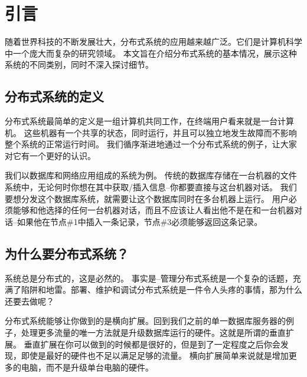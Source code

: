 \documentclass[degree=project,degree-type=project,cjk-font=noto]{thuthesis}
\begin{document}
\maketitle

\frontmatter
% 



\mainmatter

\chapter{引言}

随着世界科技的不断发展壮大，分布式系统的应用越来越广泛。它们是计算机科学中一个庞大而复杂的研究领域。
本文旨在介绍分布式系统的基本情况，展示这种系统的不同类别，同时不深入探讨细节。

\section{分布式系统的定义}

分布式系统最简单的定义是一组计算机共同工作，在终端用户看来就是一台计算机。
这些机器有一个共享的状态，同时运行，并且可以独立地发生故障而不影响整个系统的正常运行时间。
我们循序渐进地通过一个分布式系统的例子，让大家对它有一个更好的认识。

我们以数据库和网络应用组成的系统为例。
传统的数据库存储在一台机器的文件系统中，无论何时你想在其中获取/插入信息--你都要直接与这台机器对话。
我们要想分发这个数据库系统，就需要让这个数据库同时在多台机器上运行。
用户必须能够和他选择的任何一台机器对话，而且不应该让人看出他不是在和一台机器对话--如果他在节点\#1中插入一条记录，节点\#3必须能够返回这条记录。

\section{为什么要分布式系统？}

系统总是分布式的，这是必然的。
事实是--管理分布式系统是一个复杂的话题，充满了陷阱和地雷。部署、维护和调试分布式系统是一件令人头疼的事情，那为什么还要去做呢？

分布式系统能够让你做到的是横向扩展。回到我们之前的单一数据库服务器的例子，处理更多流量的唯一方法就是升级数据库运行的硬件。这就是所谓的垂直扩展。
垂直扩展在你可以做到的时候都是很好的，但是到了一定程度之后你会发现，即使是最好的硬件也不足以满足足够的流量。
横向扩展简单来说就是增加更多的电脑，而不是升级单台电脑的硬件。
\end{document}
